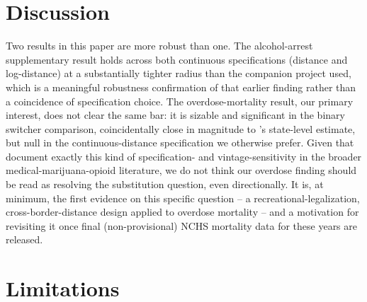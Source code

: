 \documentclass[11pt]{article}
\begin{document}
\section{Discussion}

Two results in this paper are more robust than one. The alcohol-arrest
supplementary result holds across both continuous specifications
(distance and log-distance) at a substantially tighter radius than the
companion project used, which is a meaningful robustness confirmation
of that earlier finding rather than a coincidence of specification
choice. The overdose-mortality result, our primary interest, does not
clear the same bar: it is sizable and significant in the binary
switcher comparison, coincidentally close in magnitude to
\citet{Denkyirah2026}'s state-level estimate, but null in the
continuous-distance specification we otherwise prefer. Given that
\citet{Shover2019} document exactly this kind of specification- and
vintage-sensitivity in the broader medical-marijuana-opioid literature,
we do not think our overdose finding should be read as resolving the
substitution question, even directionally. It is, at minimum, the
first evidence on this specific question -- a recreational-legalization,
cross-border-distance design applied to overdose mortality -- and a
motivation for revisiting it once final (non-provisional) NCHS
mortality data for these years are released.

\section{Limitations}
\end{document}
